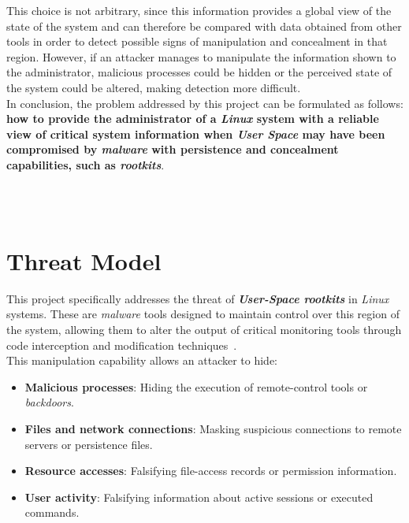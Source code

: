 This choice is not arbitrary, since this information provides a global view of the state of the system and can therefore be compared with data obtained from other tools in order to detect possible signs of manipulation and concealment in that region.
However, if an attacker manages to manipulate the information shown to the administrator, malicious processes could be hidden or the perceived state of the system could be altered, making detection more difficult.\\

In conclusion, the problem addressed by this project can be formulated as follows: \textbf{how to provide the administrator of a \textit{Linux} system with a reliable view of critical system information when \textit{User Space} may have been compromised by \textit{malware} with persistence and concealment capabilities, such as \textit{rootkits}}.\\

\

\

\section{Threat Model}
\label{sec:modelo-amenaza}

This project specifically addresses the threat of \textbf{\textit{User-Space rootkits}} in \textit{Linux} systems.
These are \textit{malware} tools designed to maintain control over this region of the system, allowing them to alter the output of critical monitoring tools through code interception and modification techniques~\cite{rootkits}.\\

This manipulation capability allows an attacker to hide:

\begin{itemize}
    \item \textbf{Malicious processes}: Hiding the execution of remote-control tools or \textit{backdoors}.
    \item \textbf{Files and network connections}: Masking suspicious connections to remote servers or persistence files.
    \item \textbf{Resource accesses}: Falsifying file-access records or permission information.
    \item \textbf{User activity}: Falsifying information about active sessions or executed commands.
\end{itemize}

\

